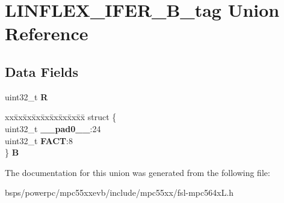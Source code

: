 \hypertarget{unionLINFLEX__IFER__32B__tag}{}\section{L\+I\+N\+F\+L\+E\+X\+\_\+\+I\+F\+E\+R\+\_\+B\+\_\+tag Union Reference}
\label{unionLINFLEX__IFER__32B__tag}
\subsection*{Data Fields}
\begin{DoxyCompactItemize}
\item 
\mbox{\label{unionLINFLEX__IFER__32B__tag_a8c85850ce9f3f72e0eecf1b06c163cc7}} 
uint32\+\_\+t {\bfseries R}
\item 
\mbox{\label{unionLINFLEX__IFER__32B__tag_af1314774b45f77c6018dc001e5e13ab1}} 
\begin{tabbing}
xx\=xx\=xx\=xx\=xx\=xx\=xx\=xx\=xx\=\kill
struct \{\\
\>uint32\_t {\bfseries \_\_pad0\_\_}:24\\
\>uint32\_t {\bfseries FACT}:8\\
\} {\bfseries B}\\

\end{tabbing}\end{DoxyCompactItemize}


The documentation for this union was generated from the following file\+:\begin{DoxyCompactItemize}
\item 
bsps/powerpc/mpc55xxevb/include/mpc55xx/fsl-\/mpc564x\+L.\+h\end{DoxyCompactItemize}
